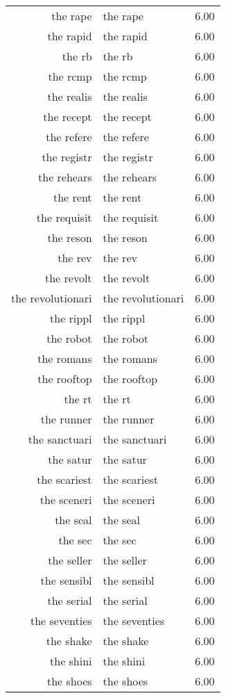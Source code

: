 \begin{table}[ht]
\begin{tabular}{rlr}
  the rape & the rape & 6.00 \\ 
  the rapid & the rapid & 6.00 \\ 
  the rb & the rb & 6.00 \\ 
  the rcmp & the rcmp & 6.00 \\ 
  the realis & the realis & 6.00 \\ 
  the recept & the recept & 6.00 \\ 
  the refere & the refere & 6.00 \\ 
  the registr & the registr & 6.00 \\ 
  the rehears & the rehears & 6.00 \\ 
  the rent & the rent & 6.00 \\ 
  the requisit & the requisit & 6.00 \\ 
  the reson & the reson & 6.00 \\ 
  the rev & the rev & 6.00 \\ 
  the revolt & the revolt & 6.00 \\ 
  the revolutionari & the revolutionari & 6.00 \\ 
  the rippl & the rippl & 6.00 \\ 
  the robot & the robot & 6.00 \\ 
  the romans & the romans & 6.00 \\ 
  the rooftop & the rooftop & 6.00 \\ 
  the rt & the rt & 6.00 \\ 
  the runner & the runner & 6.00 \\ 
  the sanctuari & the sanctuari & 6.00 \\ 
  the satur & the satur & 6.00 \\ 
  the scariest & the scariest & 6.00 \\ 
  the sceneri & the sceneri & 6.00 \\ 
  the seal & the seal & 6.00 \\ 
  the sec & the sec & 6.00 \\ 
  the seller & the seller & 6.00 \\ 
  the sensibl & the sensibl & 6.00 \\ 
  the serial & the serial & 6.00 \\ 
  the seventies & the seventies & 6.00 \\ 
  the shake & the shake & 6.00 \\ 
  the shini & the shini & 6.00 \\ 
  the shoes & the shoes & 6.00 \\ 

\end{tabular}
\end{table}
